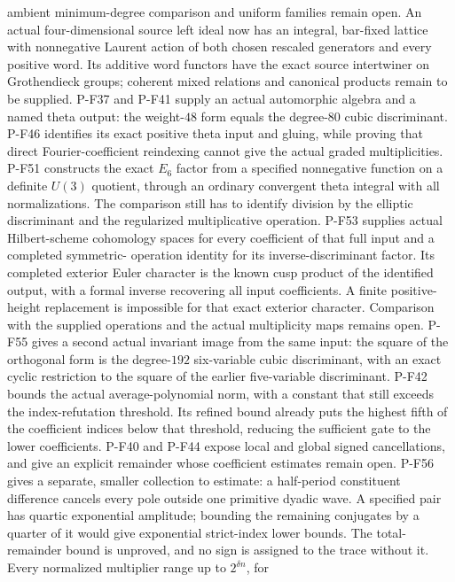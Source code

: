 \documentclass[11pt,a4paper]{article}
\begin{document}
ambient minimum-degree comparison and uniform families remain open.
An actual four-dimensional source left ideal now has an integral,
bar-fixed lattice with nonnegative Laurent action of both chosen
rescaled generators and every positive word. Its additive word
functors have the exact source intertwiner on Grothendieck groups;
coherent mixed relations and canonical products remain to be supplied.
P-F37 and P-F41
supply an actual automorphic algebra and a named theta output:
the weight-$48$ form equals the degree-$80$ cubic discriminant.
P-F46 identifies its exact positive theta input and gluing,
while proving that direct Fourier-coefficient reindexing
cannot give the actual graded multiplicities.
P-F51 constructs the exact $E_6$ factor from a specified
nonnegative function on a definite $U(3)$ quotient, through
an ordinary convergent theta integral with all normalizations.
The comparison still has to identify division by the elliptic
discriminant and the regularized multiplicative operation.
P-F53 supplies actual Hilbert-scheme cohomology spaces for
every coefficient of that full input and a completed symmetric-
operation identity for its inverse-discriminant factor. Its
completed exterior Euler character is the known cusp product of
the identified output, with a formal inverse recovering all input
coefficients. A finite positive-height replacement is impossible
for that exact exterior character. Comparison with the supplied
operations and the actual multiplicity maps remains open.
P-F55 gives a second actual invariant image from the same input:
the square of the orthogonal form is the degree-$192$
six-variable cubic discriminant, with an exact cyclic restriction
to the square of the earlier five-variable discriminant.
P-F42 bounds the actual average-polynomial norm, with a constant
that still exceeds the index-refutation threshold. Its refined
bound already puts the highest fifth of the coefficient indices
below that threshold, reducing the sufficient gate to the lower
coefficients. P-F40 and
P-F44 expose local and global signed cancellations, and give
an explicit remainder whose coefficient estimates remain open.
P-F56 gives a separate, smaller collection to estimate: a half-period
constituent difference cancels every pole outside one primitive
dyadic wave. A specified pair has quartic exponential amplitude;
bounding the remaining conjugates by a quarter of it would give
exponential strict-index lower bounds. The total-remainder bound
is unproved, and no sign is assigned to the trace without it.
Every normalized multiplier range up to $2^{\delta n}$, for
\end{document}

